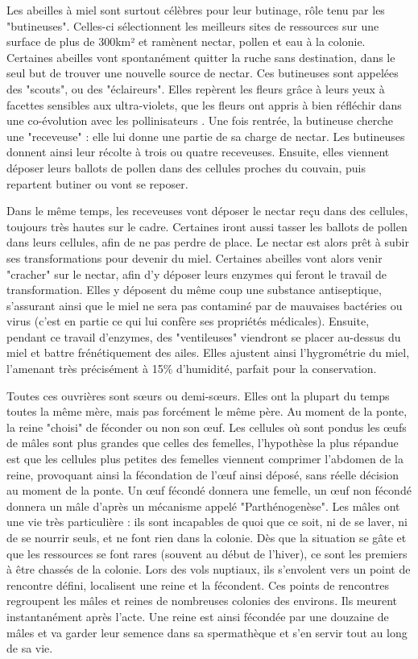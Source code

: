 			
			Les abeilles à miel sont surtout célèbres pour leur butinage, rôle tenu par les "butineuses". Celles-ci sélectionnent les meilleurs sites de ressources sur une surface de plus de 300km² \cite{riviere_modemulti-agent_2021} et ramènent nectar, pollen et eau à la colonie. Certaines abeilles vont spontanément quitter la ruche sans destination, dans le seul but de trouver une nouvelle source de nectar. Ces butineuses sont appelées des "scouts", ou des "éclaireurs". Elles repèrent les fleurs grâce à leurs yeux à facettes sensibles aux ultra-violets, que les fleurs ont appris à bien réfléchir dans une co-évolution avec les pollinisateurs \cite{thompson_concepts_1989}. Une fois rentrée, la butineuse cherche une "receveuse" : elle lui donne une partie de sa charge de nectar. Les butineuses donnent ainsi leur récolte à trois ou quatre receveuses. Ensuite, elles viennent déposer leurs ballots de pollen dans des cellules proches du couvain, puis repartent butiner ou vont se reposer. 
			
			Dans le même temps, les receveuses vont déposer le nectar reçu dans des cellules, toujours très hautes sur le cadre. Certaines iront aussi tasser les ballots de pollen dans leurs cellules, afin de ne pas perdre de place. Le nectar est alors prêt à subir ses transformations pour devenir du miel. Certaines abeilles vont alors venir "cracher" sur le nectar, afin d'y déposer leurs enzymes qui feront le travail de transformation. Elles y déposent du même coup une substance antiseptique, s'assurant ainsi que le miel ne sera pas contaminé par de mauvaises bactéries ou virus (c'est en partie ce qui lui confère ses propriétés médicales). Ensuite, pendant ce travail d'enzymes, des "ventileuses" viendront se placer au-dessus du miel et battre frénétiquement des ailes. Elles ajustent ainsi l'hygrométrie du miel, l'amenant très précisément à 15\% d'humidité, parfait pour la conservation.
			
			Toutes ces ouvrières sont sœurs ou demi-sœurs. Elles ont la plupart du temps toutes la même mère, mais pas forcément le même père. Au moment de la ponte, la reine "choisi" de féconder ou non son œuf. Les cellules où sont pondus les œufs de mâles sont plus grandes que celles des femelles, l'hypothèse la plus répandue est que les cellules plus petites des femelles viennent comprimer l'abdomen de la reine, provoquant ainsi la fécondation de l'œuf ainsi déposé, sans réelle décision au moment de la ponte. Un œuf fécondé donnera une femelle, un œuf non fécondé donnera un mâle d'après un mécanisme appelé "Parthénogenèse". 
			Les mâles ont une vie très particulière : ils sont incapables de quoi que ce soit, ni de se laver, ni de se nourrir seuls, et ne font rien dans la colonie. Dès que la situation se gâte et que les ressources se font rares (souvent au début de l'hiver), ce sont les premiers à être chassés de la colonie. Lors des vols nuptiaux, ils s'envolent vers un point de rencontre défini, localisent une reine et la fécondent. Ces points de rencontres regroupent les mâles et reines de nombreuses colonies des environs. Ils meurent instantanément après l'acte. Une reine est ainsi fécondée par une douzaine de mâles et va garder leur semence dans sa spermathèque et s'en servir tout au long de sa vie.
			
